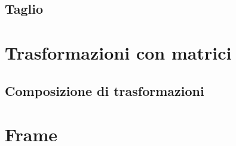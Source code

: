 \subsection{Taglio}


\section{Trasformazioni con matrici}


\subsection{Composizione di trasformazioni}


\section{Frame}
